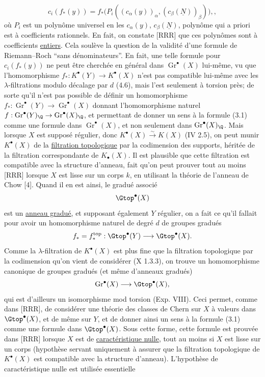 
\begin{equation}\tag{3.1}
 c_i(f_*(y))=f_*\bigl(P_i((c_\alpha(y))_\alpha,(c_\beta(\underline N))_\beta)\bigr),,
\end{equation}
où $P_i$ est un polynôme universel en les $c_\alpha(y)$, $c_\beta(\underline N)$, polynôme qui a priori est à coefficients rationnels. En fait, on constate [RRR] que ces polynômes sont à coefficients \uline{entiers}. Cela soulève la question de la validité d'une formule de Riemann--Roch ``sans dénominateurs''. En fait, une telle formule pour $c_i(f_*(y))$ ne peut être cherchée en général dans $\operatorname{Gr}^\bullet(X)$ lui-même, vu que l'homomorphisme $f_*:K^\bullet(Y)\to K^\bullet(X)$ n'est pas compatible lui-même avec les $\lambda$-filtrations modulo décalage par $d$ (4.6), mais l'est seulement à torsion près; de sorte qu'il n'est pas possible de définir un homomorphisme $f_*:\operatorname{Gr}^\bullet(Y)\longrightarrow \operatorname{Gr}^\bullet(X)$ donnant l'homomorphisme naturel $f:\operatorname{Gr}^\bullet(Y)_\Q\to\operatorname{Gr}^\bullet(X)_\Q$, et permettant de donner un sens à la formule (3.1) comme une formule dans $\operatorname{Gr}^\bullet(X)$, et non seulement dans $\operatorname{Gr}^\bullet(X)_\Q$. Mais lorsque $X$ est supposé régulier, donc $K^\bullet(X)\xrightarrow{\sim} K(X)$ (IV 2.5), on peut munir $K^\bullet(X)$ de la \uline{filtration topologique} par la codimension des supports, héritée de la filtration correspondante de $K_\bullet(X)$. Il est plausible que cette filtration est compatible avec la structure d'anneau, fait qu'on peut prouver tout au moins [RRR] lorsque $X$ est lisse sur un corps $k$, en utilisant la théorie de l'anneau de Chow [4]. Quand il en est ainsi, le gradué associé
\[
 \Gtop^\bullet(X)
\]
est un \uline{anneau gradué}, et supposant également $Y$ régulier, on a fait ce qu'il fallait pour avoir un homomorphisme naturel de degré $d$ de groupes gradués
\[
 f_*=f_*^{\mathrm{top}}:\Gtop^\bullet(Y)\longrightarrow \Gtop^\bullet(X).
\]
Comme la $\lambda$-filtration de $K^\bullet(X)$ est plus fine que la filtration topologique par la codimension qu'on vient de considérer (X 1.3.3), on trouve un homomorphisme canonique de groupes gradués (et même d'anneaux gradués)
\[
 \operatorname{Gr}^\bullet(X)\longrightarrow \Gtop^\bullet(X),
\]
qui est d'ailleurs un isomorphisme mod torsion (Exp. VIII). Ceci permet, comme dans [RRR], de considérer une théorie des classes de Chern sur $X$ à valeurs dans $\Gtop^\bullet(X)$, et de même sur $Y$, et de donner ainsi un sens à la formule (3.1) comme une formule dans $\Gtop^\bullet(X)$. Sous cette forme, cette formule est prouvée dans [RRR] lorsque $X$ est de \uline{caractéristique nulle}, tout au moins si $X$ est lisse sur un corps (hypothèse servant uniquement à assurer que la filtration topologique de $K^\bullet(X)$ est compatible avec la structure d'anneau). L'hypothèse de caractéristique nulle est utilisée
essentielle%

